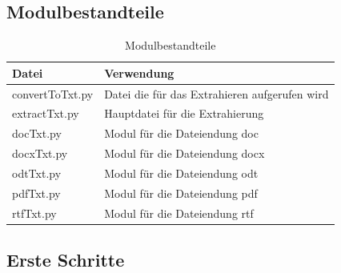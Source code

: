 \documentclass[12pt]{scrartcl}
\begin{document}
\subsection{Modulbestandteile}
\label{sec:modulbestandteile}
\begin{table}[H]
\centering
\label{modulbestandteil}
\begin{tabular}{|l|l|}
\hline
\rowcolor[HTML]{9B9B9B} 
Datei           & Verwendung                           \\ \hline
convertToTxt.py & Datei die für das Extrahieren aufgerufen wird \\ \hline
extractTxt.py   & Hauptdatei für die Extrahierung      \\ \hline
docTxt.py       & Modul für die Dateiendung doc        \\ \hline
docxTxt.py      & Modul für die Dateiendung docx       \\ \hline
odtTxt.py       & Modul für die Dateiendung odt        \\ \hline
pdfTxt.py       & Modul für die Dateiendung pdf        \\ \hline
rtfTxt.py       & Modul für die Dateiendung rtf        \\ \hline
\end{tabular}
\caption{Modulbestandteile}
\end{table}
\newpage
\subsection{Erste Schritte}
\label{sec:first-steps}
\end{document}

